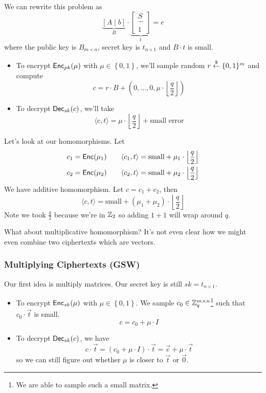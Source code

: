 We can rewrite this problem as
\[\underbrace{\left[ A\mid b \right]}_{B}\cdot \underbrace{\begin{bmatrix}
            S \\
            - \\
            1
        \end{bmatrix}}_{t} = e\]
where the public key is $B_{m\times n}$, secret key is $t_{n\times 1}$ and $B\cdot t$ is small.
\begin{itemize}
    \item To encrypt $\operatorname{\mathsf{Enc}}_{pk}(\mu)$ with $\mu\in \left\{ 0,1 \right\}$, we'll sample random $r\overset{\$}{\leftarrow} \{0, 1\}^m$ and compute
          \[c = r\cdot B + \left( 0, \dots, 0, \mu\cdot \left\lfloor \frac{q}{2}\right\rfloor \right)\]
    \item To decrypt $\operatorname{\mathsf{Dec}}_{sk}(c)$, we'll take
          \[\langle c, t\rangle = \mu\cdot \left\lfloor \frac{q}{2}\right\rfloor + \text{small error}\]
\end{itemize}

Let's look at our homomorphisms. Let
\begin{align*}
    c_1 = \operatorname{\mathsf{Enc}}(\mu_1)\qquad \langle c_1, t\rangle = \text{small} + \mu_1 \cdot \left\lfloor \frac{q}{2}\right\rfloor \\
    c_2 = \operatorname{\mathsf{Enc}}(\mu_2)\qquad \langle c_2, t\rangle = \text{small} + \mu_2 \cdot \left\lfloor \frac{q}{2}\right\rfloor
\end{align*}
We have additive homomorphism. Let $c = c_1 + c_2$, then
\[\langle c, t\rangle = \text{small} + (\mu_1 + \mu_2)\cdot \left\lfloor \frac{q}{2}\right\rfloor\]
Note we took $\frac{q}{2}$ because we're in $\mathbb Z_2$ so adding $1 + 1$ will wrap around $q$.

What about multiplicative homomorphism? It's not even clear how we might even combine two ciphertexts which are vectors.

\subsubsection{Multiplying Ciphertexts (GSW)}
Our first idea is multiply matrices. Our secret key is still $sk = t_{n\times 1}$.

\begin{itemize}
    \item To encrypt $\operatorname{\mathsf{Enc}}_{sk}(\mu)$ with $\mu\in \left\{ 0,1 \right\}$. We sample $c_0\in \mathbb Z_q^{m\times n}$\footnote{We are able to sample such a small matrix.} such that $c_0\cdot \vec{t}$ is small.
          \[c = c_0 + \mu\cdot I\]
    \item To decrypt $\operatorname{\mathsf{Dec}}_{sk}(c)$, we have
          \[c\cdot \vec{t} = (c_0 + \mu\cdot I)\cdot \vec{t} = \vec{e} + \mu\cdot \vec{t}\]
          so we can still figure out whether $\mu$ is closer to $\vec{t}$ or $\vec{0}$.
\end{itemize}

